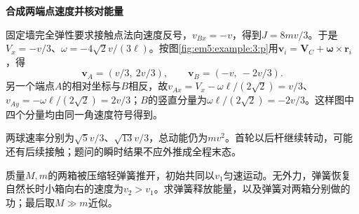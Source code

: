 \begin{solution}
\par\medskip{}\noindent\textbf{合成两端点速度并核对能量}\par\nobreak
固定墙完全弹性要求接触点法向速度反号，$v_{Bx}=-v$，得到$J=8mv/3$。于是$V_x=-v/3$、$\omega=-4\sqrt2v/(3\ell)$。按图\ref{fig:em5:example:3:p}用$\bm v_i=\bm V_C+\bm\omega\times\bm r_i$，得
\[\boxed{\bm v_A=(v/3,\ 2v/3),\qquad\bm v_B=(-v,\ -2v/3)}.\]
另一个端点$A$的相对坐标与$B$相反，故$v_{Ax}=V_x-\omega\ell/(2\sqrt2)=v/3$、$v_{Ay}=-\omega\ell/(2\sqrt2)=2v/3$；$B$的竖直分量为$\omega\ell/(2\sqrt2)=-2v/3$。这样图中四个分量均由同一角速度符号得到。

两球速率分别为$\sqrt5v/3$、$\sqrt{13}v/3$，总动能仍为$mv^2$。首轮以后杆继续转动，可能还有后续接触；题问的瞬时结果不应外推成全程末态。\end{solution}
\begin{question}\begin{example}[运动系统中弹簧的功]\label{em5:example:4}
质量$M,m$的两箱被压缩轻弹簧推开，初始共同以$v_1$匀速运动。无外力，弹簧恢复自然长时小箱向右的速度为$v_2>v_1$。求弹簧释放能量，以及弹簧对两箱分别做的功；最后取$M\gg m$近似。
\end{example}
\end{question}

